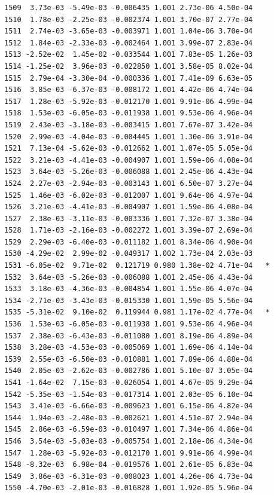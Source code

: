 \documentclass[
  letterpaper,
  DIV=11,
  numbers=noendperiod]{scrartcl}
\begin{document}
\begin{verbatim}
1509  3.73e-03 -5.49e-03 -0.006435 1.001 2.73e-06 4.50e-04    
1510  1.78e-03 -2.25e-03 -0.002374 1.001 3.70e-07 2.77e-04    
1511  2.74e-03 -3.65e-03 -0.003971 1.001 1.04e-06 3.70e-04    
1512  1.84e-03 -2.33e-03 -0.002464 1.001 3.99e-07 2.83e-04    
1513 -2.52e-02  1.45e-02 -0.033544 1.001 7.83e-05 1.26e-03    
1514 -1.25e-02  3.96e-03 -0.022850 1.001 3.58e-05 8.02e-04    
1515  2.79e-04 -3.30e-04 -0.000336 1.001 7.41e-09 6.63e-05    
1516  3.85e-03 -6.37e-03 -0.008172 1.001 4.42e-06 4.74e-04    
1517  1.28e-03 -5.92e-03 -0.012170 1.001 9.91e-06 4.99e-04    
1518  1.53e-03 -6.05e-03 -0.011938 1.001 9.53e-06 4.96e-04    
1519  2.43e-03 -3.18e-03 -0.003415 1.001 7.67e-07 3.42e-04    
1520  2.99e-03 -4.04e-03 -0.004445 1.001 1.30e-06 3.91e-04    
1521  7.13e-04 -5.62e-03 -0.012662 1.001 1.07e-05 5.05e-04    
1522  3.21e-03 -4.41e-03 -0.004907 1.001 1.59e-06 4.08e-04    
1523  3.64e-03 -5.26e-03 -0.006088 1.001 2.45e-06 4.43e-04    
1524  2.27e-03 -2.94e-03 -0.003143 1.001 6.50e-07 3.27e-04    
1525  1.46e-03 -6.02e-03 -0.012007 1.001 9.64e-06 4.97e-04    
1526  3.21e-03 -4.41e-03 -0.004907 1.001 1.59e-06 4.08e-04    
1527  2.38e-03 -3.11e-03 -0.003336 1.001 7.32e-07 3.38e-04    
1528  1.71e-03 -2.16e-03 -0.002272 1.001 3.39e-07 2.69e-04    
1529  2.29e-03 -6.40e-03 -0.011182 1.001 8.34e-06 4.90e-04    
1530 -4.29e-02  2.99e-02 -0.049317 1.002 1.73e-04 2.03e-03    
1531 -6.05e-02  9.71e-02  0.121719 0.980 1.38e-02 4.71e-04   *
1532  3.64e-03 -5.26e-03 -0.006088 1.001 2.45e-06 4.43e-04    
1533  3.18e-03 -4.36e-03 -0.004854 1.001 1.55e-06 4.07e-04    
1534 -2.71e-03 -3.43e-03 -0.015330 1.001 1.59e-05 5.56e-04    
1535 -5.31e-02  9.10e-02  0.119944 0.981 1.17e-02 4.77e-04   *
1536  1.53e-03 -6.05e-03 -0.011938 1.001 9.53e-06 4.96e-04    
1537  2.38e-03 -6.43e-03 -0.011080 1.001 8.19e-06 4.89e-04    
1538  3.28e-03 -4.53e-03 -0.005069 1.001 1.69e-06 4.14e-04    
1539  2.55e-03 -6.50e-03 -0.010881 1.001 7.89e-06 4.88e-04    
1540  2.05e-03 -2.62e-03 -0.002786 1.001 5.10e-07 3.05e-04    
1541 -1.64e-02  7.15e-03 -0.026054 1.001 4.67e-05 9.29e-04    
1542 -5.35e-03 -1.54e-03 -0.017314 1.001 2.03e-05 6.10e-04    
1543  3.41e-03 -6.66e-03 -0.009623 1.001 6.15e-06 4.82e-04    
1544  1.94e-03 -2.48e-03 -0.002621 1.001 4.51e-07 2.94e-04    
1545  2.86e-03 -6.59e-03 -0.010497 1.001 7.34e-06 4.86e-04    
1546  3.54e-03 -5.03e-03 -0.005754 1.001 2.18e-06 4.34e-04    
1547  1.28e-03 -5.92e-03 -0.012170 1.001 9.91e-06 4.99e-04    
1548 -8.32e-03  6.98e-04 -0.019576 1.001 2.61e-05 6.83e-04    
1549  3.86e-03 -6.31e-03 -0.008023 1.001 4.26e-06 4.73e-04    
1550 -4.70e-03 -2.01e-03 -0.016828 1.001 1.92e-05 5.96e-04    

\end{verbatim}
\end{document}
